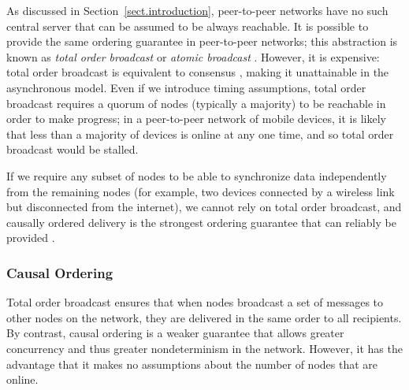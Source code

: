 As discussed in Section~\ref{sect.introduction}, peer-to-peer networks have no such central server
that can be assumed to be always reachable. It is possible to provide the same ordering guarantee in
peer-to-peer networks; this abstraction is known as \emph{total order broadcast} or \emph{atomic
broadcast} \cite{Cachin:2011wt}. However, it is expensive: total order broadcast is equivalent to
consensus \cite{Chandra:1996cp}, making it unattainable in the asynchronous model. Even if we
introduce timing assumptions, total order broadcast requires a quorum of nodes (typically a
majority) to be reachable in order to make progress; in a peer-to-peer network of mobile devices, it
is likely that less than a majority of devices is online at any one time, and so total order
broadcast would be stalled.

If we require any subset of nodes to be able to synchronize data independently from the remaining
nodes (for example, two devices connected by a wireless link but disconnected from the internet), we
cannot rely on total order broadcast, and causally ordered delivery is the strongest ordering
guarantee that can reliably be provided \cite{Attiya:2015dm}.

\subsubsection{Causal Ordering}

Total order broadcast ensures that when nodes broadcast a set of messages to other nodes on the
network, they are delivered in the same order to all recipients. By contrast, causal ordering is a
weaker guarantee that allows greater concurrency and thus greater nondeterminism in the network.
However, it has the advantage that it makes no assumptions about the number of nodes that are
online.




